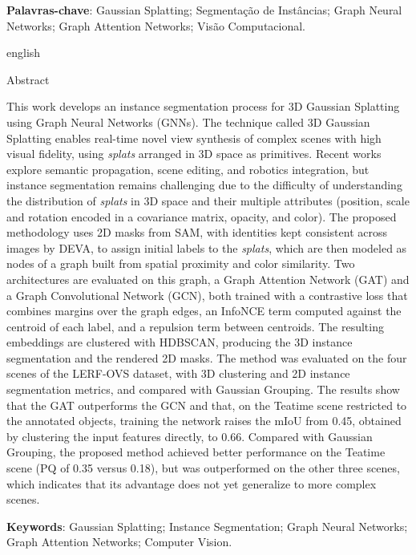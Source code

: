 \begin{resumo}
    \vspace{\onelineskip}

    \noindent\textbf{Palavras-chave}: Gaussian Splatting; Segmentação de Instâncias; Graph Neural Networks; Graph Attention Networks; Visão Computacional.
    
    \vspace{\onelineskip}
    \vspace{\onelineskip}
    \clearpage
    
    \begin{otherlanguage*}{english}
    \begin{center}{\ABNTEXchapterfont\huge Abstract}\end{center}
    
    This work develops an instance segmentation process for 3D Gaussian Splatting using Graph Neural Networks (GNNs). The technique called 3D Gaussian Splatting enables real-time novel view synthesis of complex scenes with high visual fidelity, using \emph{splats} arranged in 3D space as primitives. Recent works explore semantic propagation, scene editing, and robotics integration, but instance segmentation remains challenging due to the difficulty of understanding the distribution of \emph{splats} in 3D space and their multiple attributes (position, scale and rotation encoded in a covariance matrix, opacity, and color). The proposed methodology uses 2D masks from SAM, with identities kept consistent across images by DEVA, to assign initial labels to the \emph{splats}, which are then modeled as nodes of a graph built from spatial proximity and color similarity. Two architectures are evaluated on this graph, a Graph Attention Network (GAT) and a Graph Convolutional Network (GCN), both trained with a contrastive loss that combines margins over the graph edges, an InfoNCE term computed against the centroid of each label, and a repulsion term between centroids. The resulting embeddings are clustered with HDBSCAN, producing the 3D instance segmentation and the rendered 2D masks. The method was evaluated on the four scenes of the LERF-OVS dataset, with 3D clustering and 2D instance segmentation metrics, and compared with Gaussian Grouping. The results show that the GAT outperforms the GCN and that, on the Teatime scene restricted to the annotated objects, training the network raises the mIoU from 0.45, obtained by clustering the input features directly, to 0.66. Compared with Gaussian Grouping, the proposed method achieved better performance on the Teatime scene (PQ of 0.35 versus 0.18), but was outperformed on the other three scenes, which indicates that its advantage does not yet generalize to more complex scenes.
    
    \vspace{\onelineskip}
    
    \noindent\textbf{Keywords}: Gaussian Splatting; Instance Segmentation; Graph Neural Networks; Graph Attention Networks; Computer Vision.
    \end{otherlanguage*}
\end{resumo}

